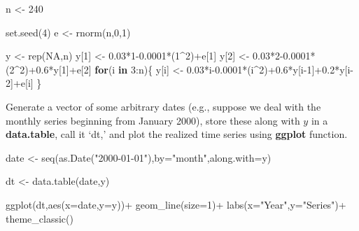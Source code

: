 \documentclass[
  oneside]{book}
\newenvironment{Shaded}{\begin{snugshade}}{\end{snugshade}}
\newcommand{\AttributeTok}[1]{\textcolor[rgb]{0.77,0.63,0.00}{#1}}
\newcommand{\ConstantTok}[1]{\textcolor[rgb]{0.00,0.00,0.00}{#1}}
\newcommand{\ControlFlowTok}[1]{\textcolor[rgb]{0.13,0.29,0.53}{\textbf{#1}}}
\newcommand{\DecValTok}[1]{\textcolor[rgb]{0.00,0.00,0.81}{#1}}
\newcommand{\FloatTok}[1]{\textcolor[rgb]{0.00,0.00,0.81}{#1}}
\newcommand{\FunctionTok}[1]{\textcolor[rgb]{0.00,0.00,0.00}{#1}}
\newcommand{\NormalTok}[1]{#1}
\newcommand{\OtherTok}[1]{\textcolor[rgb]{0.56,0.35,0.01}{#1}}
\newcommand{\SpecialCharTok}[1]{\textcolor[rgb]{0.00,0.00,0.00}{#1}}
\newcommand{\StringTok}[1]{\textcolor[rgb]{0.31,0.60,0.02}{#1}}
\begin{document}
\begin{Shaded}
\begin{Highlighting}[]
\NormalTok{n }\OtherTok{\textless{}{-}} \DecValTok{240}

\FunctionTok{set.seed}\NormalTok{(}\DecValTok{4}\NormalTok{)}
\NormalTok{e }\OtherTok{\textless{}{-}} \FunctionTok{rnorm}\NormalTok{(n,}\DecValTok{0}\NormalTok{,}\DecValTok{1}\NormalTok{)}

\NormalTok{y }\OtherTok{\textless{}{-}} \FunctionTok{rep}\NormalTok{(}\ConstantTok{NA}\NormalTok{,n)}
\NormalTok{y[}\DecValTok{1}\NormalTok{] }\OtherTok{\textless{}{-}} \FloatTok{0.03}\SpecialCharTok{*}\DecValTok{1}\FloatTok{{-}0.0001}\SpecialCharTok{*}\NormalTok{(}\DecValTok{1}\SpecialCharTok{\^{}}\DecValTok{2}\NormalTok{)}\SpecialCharTok{+}\NormalTok{e[}\DecValTok{1}\NormalTok{]}
\NormalTok{y[}\DecValTok{2}\NormalTok{] }\OtherTok{\textless{}{-}} \FloatTok{0.03}\SpecialCharTok{*}\DecValTok{2}\FloatTok{{-}0.0001}\SpecialCharTok{*}\NormalTok{(}\DecValTok{2}\SpecialCharTok{\^{}}\DecValTok{2}\NormalTok{)}\SpecialCharTok{+}\FloatTok{0.6}\SpecialCharTok{*}\NormalTok{y[}\DecValTok{1}\NormalTok{]}\SpecialCharTok{+}\NormalTok{e[}\DecValTok{2}\NormalTok{]}
\ControlFlowTok{for}\NormalTok{(i }\ControlFlowTok{in} \DecValTok{3}\SpecialCharTok{:}\NormalTok{n)\{}
\NormalTok{  y[i] }\OtherTok{\textless{}{-}} \FloatTok{0.03}\SpecialCharTok{*}\NormalTok{i}\FloatTok{{-}0.0001}\SpecialCharTok{*}\NormalTok{(i}\SpecialCharTok{\^{}}\DecValTok{2}\NormalTok{)}\SpecialCharTok{+}\FloatTok{0.6}\SpecialCharTok{*}\NormalTok{y[i}\DecValTok{{-}1}\NormalTok{]}\SpecialCharTok{+}\FloatTok{0.2}\SpecialCharTok{*}\NormalTok{y[i}\DecValTok{{-}2}\NormalTok{]}\SpecialCharTok{+}\NormalTok{e[i]}
\NormalTok{\}}
\end{Highlighting}
\end{Shaded}

Generate a vector of some arbitrary dates (e.g., suppose we deal with the monthly series beginning from January 2000), store these along with \(y\) in a \textbf{data.table}, call it `dt,' and plot the realized time series using \textbf{ggplot} function.

\begin{Shaded}
\begin{Highlighting}[]
\NormalTok{date }\OtherTok{\textless{}{-}} \FunctionTok{seq}\NormalTok{(}\FunctionTok{as.Date}\NormalTok{(}\StringTok{"2000{-}01{-}01"}\NormalTok{),}\AttributeTok{by=}\StringTok{"month"}\NormalTok{,}\AttributeTok{along.with=}\NormalTok{y)}

\NormalTok{dt }\OtherTok{\textless{}{-}} \FunctionTok{data.table}\NormalTok{(date,y)}

\FunctionTok{ggplot}\NormalTok{(dt,}\FunctionTok{aes}\NormalTok{(}\AttributeTok{x=}\NormalTok{date,}\AttributeTok{y=}\NormalTok{y))}\SpecialCharTok{+}
  \FunctionTok{geom\_line}\NormalTok{(}\AttributeTok{size=}\DecValTok{1}\NormalTok{)}\SpecialCharTok{+}
  \FunctionTok{labs}\NormalTok{(}\AttributeTok{x=}\StringTok{"Year"}\NormalTok{,}\AttributeTok{y=}\StringTok{"Series"}\NormalTok{)}\SpecialCharTok{+}
  \FunctionTok{theme\_classic}\NormalTok{()}
\end{Highlighting}
\end{Shaded}
\end{document}
